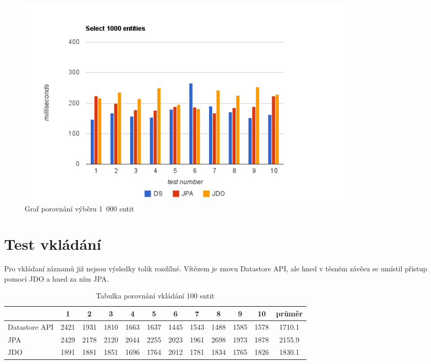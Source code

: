 \begin{figure}[h]
\begin{center}
\includegraphics[width=6.5in]{figures/select.png}
\caption{Graf porovnání výběru 1~000 entit}
\label{fig:select}
\end{center}
\end{figure}

\section{Test vkládání}
Pro vkládaní záznamů již nejsou výsledky tolik rozdílné. Vítězem je znovu Datastore API, ale hned v těsném závěsu se umístil přístup pomocí JDO a hned za ním JPA. 

\begin{table}[h]
\centering
\caption{Tabulka porovnání vkládání 100 entit }\label{tab:insert}
\begin{tabular}{|l|c|c|c|c|c|c|c|c|c|c|c|}
   \hline
	& 1		& 2		& 3		& 4		& 5		& 6		& 7		& 8		& 9		& 10		& průměr \\
   \hline
Datastore API	& 2421	& 1931	& 1810	& 1663	& 1637	& 1445	& 1543	& 1488	& 1585	& 1578	& 1710.1 \\
JPA	& 2429	& 2178	& 2120	& 2044	& 2255	& 2023	& 1961	& 2698	& 1973	& 1878	& 2155.9 \\
JDO	& 1891	& 1881	& 1851	& 1696	& 1764	& 2012	& 1781	& 1834	& 1765	& 1826	& 1830.1 \\
   \hline
\end{tabular}
\end{table}

